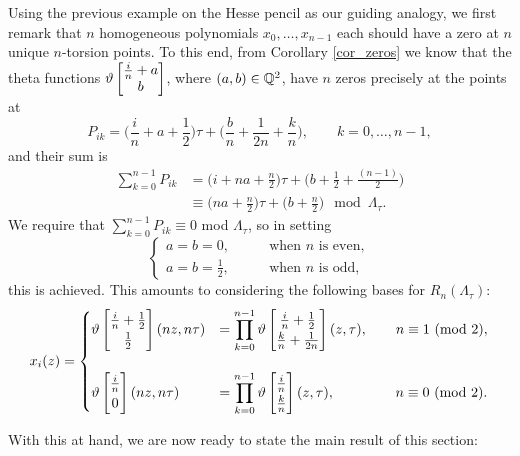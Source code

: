 Using the previous example on the Hesse pencil as our guiding analogy, we first remark that $n$ homogeneous polynomials $x_{0}, \ldots, x_{n-1}$ each should have a zero at $n$ unique $n$-torsion points. To this end, from Corollary \ref{cor_zeros} we know that the theta functions $\vartheta\begin{bmatrix} \frac{i}{n} + a\\ b \end{bmatrix}$, where $(a,b) \in \mathbb{Q}^{2}$, have $n$ zeros precisely at the points at
\begin{equation*}
	P_{ik} = \bigg(\frac{i}{n} + a + \frac{1}{2}\bigg)\tau + \bigg(\frac{b}{n} + \frac{1}{2n} + \frac{k}{n}\bigg),\qquad k = 0,\ldots,n-1,
\end{equation*}
and their sum is
\begin{equation}
\begin{split}
	\label{zero_point_sum}
	\sum_{k=0}^{n-1} P_{ik} &= \bigg(i + na + \frac{n}{2}\bigg)\tau + \bigg(b + \frac{1}{2} + \frac{(n-1)}{2}\bigg)\\
	&\equiv \bigg(na + \frac{n}{2}\bigg)\tau + \bigg(b + \frac{n}{2}\bigg)\mod \Lambda_{\tau}.
\end{split}
\end{equation}
We require that $\sum_{k=0}^{n-1}P_{ik} \equiv 0$ mod $\Lambda_{\tau}$, so in setting
\begin{equation*}
	\begin{cases}
	a = b = 0,\qquad &\text{when $n$ is even},\\
	a = b = \frac{1}{2},\qquad &\text{when $n$ is odd,}
	\end{cases}
\end{equation*}
this is achieved. This amounts to considering the following bases for $R_{n}(\Lambda_{\tau})$:
\begin{equation}
	\label{general_n_basis}
	x_{i}(z) =
	\begin{cases}
	\vtc{\frac{i}{n} + \frac{1}{2}}{\frac{1}{2}}(nz,n\tau) &= \displaystyle\prod_{k=0}^{n-1}\vtc{\frac{i}{n} + \frac{1}{2}}{\frac{k}{n} + \frac{1}{2n}}(z,\tau),\qquad n\equiv 1\ (\text{mod } 2),\\
	\\
	\vtc{\frac{i}{n}}{0}(nz,n\tau) &= \displaystyle\prod_{k=0}^{n-1}\vtc{\frac{i}{n}}{\frac{k}{n}}(z,\tau),\qquad\qquad\ n\equiv 0\ (\text{mod } 2).\\
	\end{cases}
\end{equation}

With this at hand, we are now ready to state the main result of this section:\\

